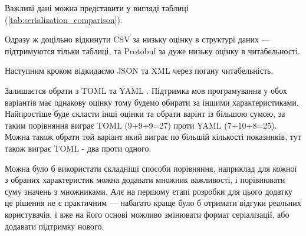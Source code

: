 \documentclass[14pt]{extarticle}
\begin{document}
  Важливі дані можна представити у вигляді таблиці
  (\ref{tab:serialization_comparison}).

  \begin{table}
    \centering
  \end{table}

  Одразу ж доцільно відкинути CSV \cite{wiki_csv}
  за низьку оцінку в структурі даних --- підтримуются тільки таблиці,
  та Protobuf \cite{wiki_protobuf} за дуже низьку оцінку в читабельності.

  Наступним кроком відкидаємо JSON \cite{wiki_json}
  та XML \cite{wiki_xml} через погану читабельність.

  Залишаєтся обрати з TOML \cite{wiki_toml} та YAML \cite{wiki_yaml}.
  Підтримка мов програмування у обох
  варіантів має однакову оцінку тому будемо обирати за іншими характеристиками.
  Найпростіше буде скласти інші оцінки та обрати варінт із більшою сумою,
  за таким порівняння виграє TOML (9+9+9=27) проти YAML (7+10+8=25).
  Можна також обрати той варіант який виграє по більшій кількості показників,
  тут також виграє TOML - два проти одного.

  Можна було б використати складніші способи порівняння,
  наприклад для кожної з обраних характеристик можна додавати множник
  важливості, і порівнювати суму значень з множниками.
  Алє на першому єтапі розробки для цього додатку це рішення не є практичним ---
  набагато краще було б отримати відгуки реальних користувачів,
  і вже на його основі можливо змінювати формат серіалізації,
  або додавати підтримку нового.
\end{document}
